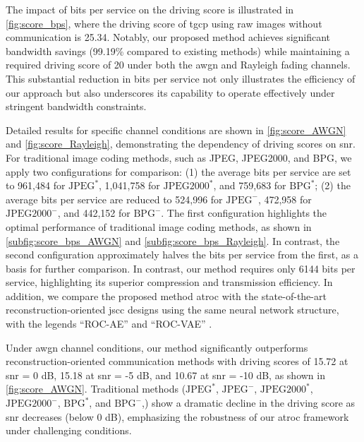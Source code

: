 The impact of bits per service on the driving score is illustrated in \cref{fig:score_bps}, where the driving score of \gls{tgcp} using raw images without communication is 25.34.
Notably, our proposed method achieves significant bandwidth savings (99.19\% compared to existing methods) while maintaining a required driving score of 20 under both the \gls{awgn} and Rayleigh fading channels. This substantial reduction in bits per service not only illustrates the efficiency of our approach but also underscores its capability to operate effectively under stringent bandwidth constraints. 

Detailed results for specific channel conditions are shown in \cref{fig:score_AWGN} and \cref{fig:score_Rayleigh}, demonstrating the dependency of driving scores on \gls{snr}. For traditional image coding methods, such as JPEG, JPEG2000, and BPG, we apply two configurations for comparison: (1) the average bits per service are set to 961,484 for \(\text{JPEG}^{*}\), 1,041,758 for \(\text{JPEG2000}^{*}\), and 759,683 for \(\text{BPG}^{*}\); (2) the average bits per service are reduced to 524,996 for \(\text{JPEG}^{-}\), 472,958 for \(\text{JPEG2000}^{-}\), and 442,152 for \(\text{BPG}^{-}\). The first configuration highlights the optimal performance of traditional image coding methods, as shown in \cref{subfig:score_bps_AWGN} and \cref{subfig:score_bps_Rayleigh}. In contrast, the second configuration approximately halves the bits per service from the first, as a basis for further comparison.
In contrast, our method requires only 6144 bits per service, highlighting its superior compression and transmission efficiency. In addition, we compare the proposed method \gls{atroc} with the state-of-the-art reconstruction-oriented \gls{jscc} designs using the same neural network structure, with the legends ``ROC-AE'' \cite{Bourtsoulatze_2019_DJS} and ``ROC-VAE'' \cite{Saidutta_2021_JSC}.

Under \gls{awgn} channel conditions, our method significantly outperforms reconstruction-oriented communication methods with driving scores of 15.72 at \gls{snr} = 0 dB, 15.18 at \gls{snr} = -5 dB, and 10.67 at \gls{snr} = -10 dB, as shown in \cref{fig:score_AWGN}. Traditional methods (\(\text{JPEG}^{*}\), \(\text{JPEG}^{-}\),  \(\text{JPEG2000}^{*}\), \(\text{JPEG2000}^{-}\), \(\text{BPG}^{*}\), and \(\text{BPG}^{-}\),) show a dramatic decline in the driving score as \gls{snr} decreases (below 0 dB), emphasizing the robustness of our \gls{atroc} framework under challenging conditions.

